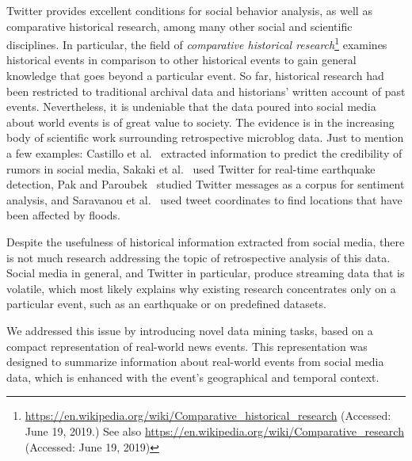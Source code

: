 %
Twitter provides excellent conditions for social behavior analysis, as well as
comparative historical research, among many other social and scientific
disciplines.  
%
In particular, the field of {\em comparative historical
research}\footnote{\url{https://en.wikipedia.org/wiki/Comparative_historical_research}
(Accessed: June 19, 2019.) See also
\url{https://en.wikipedia.org/wiki/Comparative_research} (Accessed: June 19,
2019)} examines historical events in comparison to other historical events to
gain general knowledge that goes beyond a particular event. 
%
So far, historical research had been restricted to traditional archival data and
historians' written account of past events. 
%
Nevertheless, it is undeniable that the data poured into social media about
world events is of great value to society. 
%
The evidence is in the increasing body of scientific work surrounding retrospective
microblog data.  
%
Just to mention a few examples: Castillo et al.~\cite{castillo2011information}
extracted information to predict the credibility of rumors in social media,
Sakaki et al.~\cite{Sakaki2010} used Twitter for real-time earthquake detection,
Pak and Paroubek~\cite{Pak:Twitter:2010} studied Twitter messages as a corpus
for sentiment analysis, and Saravanou et al.~\cite{Saravanou:Twitter:2015} used
tweet coordinates to find locations that have been affected by floods.


Despite the usefulness of historical information extracted from social media,
there is not much research addressing the topic of retrospective analysis of
this data.
%
Social media in general, and Twitter in particular, produce streaming data that
is volatile, which most likely explains why existing research concentrates only
on a particular event, such as an earthquake or on predefined datasets.

We addressed this issue by introducing novel data mining tasks, based on a
compact representation of real-world news events. 
%
This representation was designed to summarize information about real-world
events from social media data, which is enhanced with the event's geographical
and temporal context.


